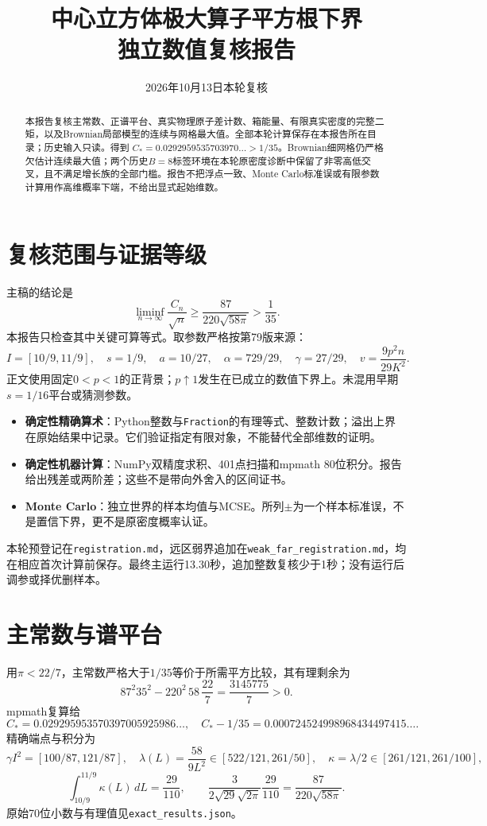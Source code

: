 \documentclass[UTF8,a4paper,11pt,fontset=none]{ctexart}
\title{中心立方体极大算子平方根下界\\独立数值复核报告}
\author{2026年10月13日本轮复核}\date{}
\begin{document}
\maketitle
\begin{abstract}
本报告复核主常数、正谱平台、真实物理原子差计数、箱能量、有限真实密度的完整二矩，以及Brownian局部模型的连续与网格最大值。全部本轮计算保存在本报告所在目录；历史输入只读。得到
\(C_*=0.0292959535703970\ldots>1/35\)。Brownian细网格仍严格欠估计连续最大值；两个历史\(B=8\)标签环境在本轮原密度诊断中保留了非零高低交叉，且不满足增长族的全部门槛。报告不把浮点一致、Monte Carlo标准误或有限参数计算用作高维概率下端，不给出显式起始维数。
\end{abstract}

\section{复核范围与证据等级}
主稿的结论是
\[
\liminf_{n\to\infty}\frac{C_n}{\sqrt n}\ge
\frac{87}{220\sqrt{58\pi}}>\frac1{35}.
\]
本报告只检查其中关键可算等式。取参数严格按第79版来源：
\[
I=[10/9,11/9],\quad s=1/9,\quad a=10/27,\quad
\alpha=729/29,\quad\gamma=27/29,
\quad v=\frac{9p^2n}{29K^2}.
\]
正文使用固定\(0<p<1\)的正背景；\(p\uparrow1\)发生在已成立的数值下界上。未混用早期\(s=1/16\)平台或猜测参数。

\begin{itemize}
\item \textbf{确定性精确算术}：Python整数与\texttt{Fraction}的有理等式、整数计数；溢出上界在原始结果中记录。它们验证指定有限对象，不能替代全部维数的证明。
\item \textbf{确定性机器计算}：NumPy双精度求积、401点扫描和mpmath 80位积分。报告给出残差或两阶差；这些不是带向外舍入的区间证书。
\item \textbf{Monte Carlo}：独立世界的样本均值与MCSE。所列\(\pm\)为一个样本标准误，不是置信下界，更不是原密度概率认证。
\end{itemize}
本轮预登记在\nolinkurl{registration.md}，远区弱界追加在\nolinkurl{weak_far_registration.md}，均在相应首次计算前保存。最终主运行13.30秒，追加整数复核少于1秒；没有运行后调参或择优删样本。

\section{主常数与谱平台}
用\(\pi<22/7\)，主常数严格大于\(1/35\)等价于所需平方比较，其有理剩余为
\[
87^2 35^2-220^2\,58\,\frac{22}{7}
=\frac{3145775}{7}>0.
\]
mpmath复算给
\[
C_*=0.029295953570397005925986\ldots,\quad
C_*-1/35=0.000724524998968434497415\ldots .
\]
精确端点与积分为
\[
\gamma I^2=[100/87,121/87],\quad
\lambda(L)=\frac{58}{9L^2}\in[522/121,261/50],\quad
\kappa=\lambda/2\in[261/121,261/100],
\]
\[
\int_{10/9}^{11/9}\kappa(L)\,dL=\frac{29}{110},\qquad
\frac{3}{2\sqrt{29}\sqrt{2\pi}}\frac{29}{110}
=\frac{87}{220\sqrt{58\pi}}.
\]
原始70位小数与有理值见\nolinkurl{exact_results.json}。
\end{document}
